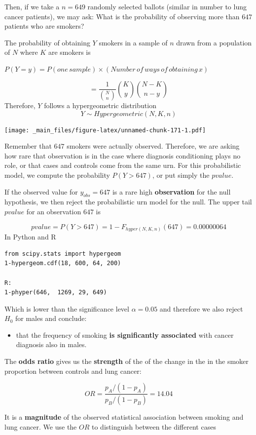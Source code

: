 \documentclass[
]{book}
\providecommand{\tightlist}{%
  \setlength{\itemsep}{0pt}\setlength{\parskip}{0pt}}
\begin{document}
Then, if we take a \(n=649\) randomly selected ballots (similar in number to lung cancer patients), we may ask: What is the probability of observing more than \(647\) patients who are smokers?

The probability of obtaining \(Y\) smokers in a sample of \(n\) drawn from a population of \(N\) where \(K\) are smokers is

\(P(Y=y)=P(one\,sample) \times (Number\, of\, ways\, of\, obtaining\, x)\)

\[=\frac{1}{\binom N n}\binom K y \binom {N-K} {n-y}\]
Therefore, \(Y\) follows a hypergeometric distribution
\[Y \sim Hypergeometric(N,K,n)\]

\texttt{[image: \_main\_files/figure-latex/unnamed-chunk-171-1.pdf]}

Remember that \(647\) smokers were actually observed. Therefore, we are asking how rare that observation is in the case where diagnosis conditioning plays no role, or that cases and controls come from the same urn. For this probabilistic model, we compute the probability \(P(Y>647)\), or put simply the \(pvalue\).

If the observed value for \(y_{obs}=647\) is a rare high \textbf{observation} for the null hypothesis, we then reject the probabilistic urn model for the null. The upper tail \(pvalue\) for an observation \(647\) is

\[pvalue=P(Y > 647)= 1- F_{hyper(N,K,n)}(647) = 0.00000064\]
In Python and R

\begin{verbatim}
from scipy.stats import hypergeom
1-hypergeom.cdf(18, 600, 64, 200)

R:
1-phyper(646,  1269, 29, 649)
\end{verbatim}

Which is lower than the significance level \(\alpha=0.05\) and therefore we also reject \(H_0\) for males and conclude:

\begin{itemize}
\tightlist
\item
  that the frequency of smoking \textbf{is significantly associated} with cancer diagnosis also in males.
\end{itemize}

The \textbf{odds ratio} gives us the \textbf{strength} of the of the change in the in the smoker proportion between controls and lung cancer:

\[OR=\frac{p_A/(1-p_A)}{p_B/(1-p_B)}=14.04\]

It is a \textbf{magnitude} of the observed statistical association between smoking and lung cancer. We use the \(OR\) to distinguish between the different cases
\end{document}

